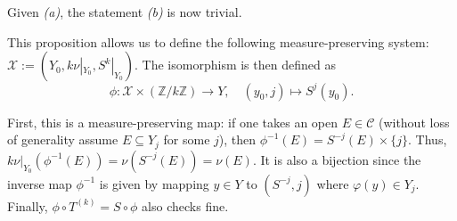 \documentclass{template}
\begin{document}
Given \textit{(a)}, the statement \textit{(b)} is now trivial.

This proposition allows us to define the following measure-preserving system:
$\mathcal{X} := (Y_0, k \nu|_{Y_0}, S^k|_{Y_0})$. The isomorphism is then defined as
\begin{equation*}
    \phi: \mathcal{X} \times (\mathbb{Z}/k\mathbb{Z}) \to Y, \quad (y_0,j) \mapsto S^j(y_0).
\end{equation*}

First, this is a measure-preserving map: if one takes an open $E \in
\mathcal{C}$ (without loss of generality assume $E \subseteq Y_j$ for some $j$),
then $\phi^{-1}(E) = S^{-j}(E) \times \{j\}$. Thus, $k\nu|_{Y_0}(\phi^{-1}(E)) =
\nu(S^{-j}(E)) = \nu(E)$. It is also a bijection since the inverse map
$\phi^{-1}$ is given by mapping $y \in Y$ to $(S^{-j},j)$ where $\varphi(y) \in
Y_j$. Finally, $\phi \circ T^{(k)} = S \circ \phi$ also checks fine.

\nocite{*}
\renewcommand{\refname}{}


\end{document}
